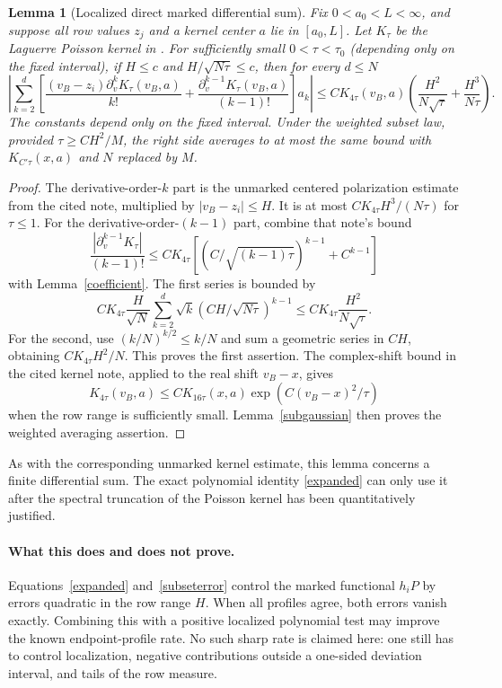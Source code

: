 \documentclass[11pt]{article}
\newtheorem{lemma}{Lemma}\newtheorem{theorem}{Theorem}
\begin{document}
\begin{lemma}[Localized direct marked differential sum]\label{markedkernel}
Fix $0<a_0<L<\infty$, and suppose all row values $z_j$ and a kernel
center $a$ lie in $[a_0,L]$. Let $K_\tau$ be the Laguerre Poisson
kernel in .
For sufficiently small $0<\tau<\tau_0$ (depending only on the fixed interval),
if $H\le c$ and $H/\sqrt{N\tau}\le c$, then for every $d\le N$
\[
 \left|\sum_{k=2}^{d}
 \left[\frac{(v_B-z_i)\partial_v^kK_\tau(v_B,a)}{k!}
 +\frac{\partial_v^{k-1}K_\tau(v_B,a)}{(k-1)!}\right]a_k\right|
 \le C K_{4\tau}(v_B,a)
       \left(\frac{H^2}{N\sqrt\tau}+\frac{H^3}{N\tau}\right).
\]
The constants depend only on the fixed interval. Under the weighted
subset law, provided $\tau\ge C H^2/M$, the right side averages to
at most the same bound with $K_{C'\tau}(x,a)$ and $N$ replaced by $M$.
\end{lemma}
\begin{proof}
The derivative-order-$k$ part is the unmarked centered polarization
estimate from the cited note, multiplied by $|v_B-z_i|\le H$.
It is at most $C K_{4\tau}H^3/(N\tau)$ for $\tau\le1$.
For the derivative-order-$(k-1)$ part, combine that note's bound
\[
 \frac{|\partial_v^{k-1}K_\tau|}{(k-1)!}
 \le C K_{4\tau}
       \left[(C/\sqrt{(k-1)\tau})^{k-1}+C^{k-1}\right]
\]
with Lemma~\ref{coefficient}. The first series is bounded by
\[
 C K_{4\tau}\frac H{\sqrt N}
       \sum_{k=2}^{d}\sqrt{k}
                 (CH/\sqrt{N\tau})^{k-1}
 \le C K_{4\tau}\frac{H^2}{N\sqrt\tau}.
\]
For the second, use $(k/N)^{k/2}\le k/N$ and sum a geometric series
in $CH$, obtaining $C K_{4\tau}H^2/N$.
This proves the first assertion. The complex-shift bound in the
cited kernel note, applied to the real shift $v_B-x$, gives
\[
 K_{4\tau}(v_B,a)\le C K_{16\tau}(x,a)
                        \exp(C(v_B-x)^2/\tau)
\]
when the row range is sufficiently small. Lemma~\ref{subgaussian}
then proves the weighted averaging assertion.
\end{proof}

As with the corresponding unmarked kernel estimate, this lemma concerns
a finite differential sum. The exact polynomial identity
\eqref{expanded} can only use it after the spectral truncation of the
Poisson kernel has been quantitatively justified.

\paragraph{What this does and does not prove.}
Equations~\eqref{expanded} and~\eqref{subseterror} control the marked
functional $h_iP$ by errors quadratic in the row range $H$.
When all profiles agree, both errors vanish exactly. Combining this
with a positive localized polynomial test may improve the known
endpoint-profile rate. No such sharp rate is claimed here: one still
has to control localization, negative contributions outside a
one-sided deviation interval, and tails of the row measure.
\end{document}
